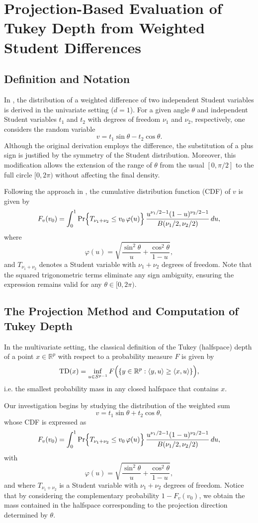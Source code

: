 \chapter{Projection-Based Evaluation of Tukey Depth from Weighted Student Differences}

\section{Definition and Notation}

In \cite{Ruben1960}, the distribution of a weighted difference of two independent Student variables is derived in the univariate setting (\(d=1\)). For a given angle \(\theta\) and independent Student variables \(t_1\) and \(t_2\) with degrees of freedom \(\nu_1\) and \(\nu_2\), respectively, one considers the random variable
\[
v = t_1\sin\theta - t_2\cos\theta.
\]
Although the original derivation employs the difference, the substitution of a plus sign is justified by the symmetry of the Student distribution. Moreover, this modification allows the extension of the range of \(\theta\) from the usual \([0,\pi/2]\) to the full circle \([0,2\pi)\) without affecting the final density.

Following the approach in \cite{Ruben1960}, the cumulative distribution function (CDF) of \(v\) is given by
\[
F_v(v_0)=\int_0^1 \Pr\Bigl\{T_{\nu_1+\nu_2}\le v_0\,\varphi(u)\Bigr\}\,\frac{u^{\nu_1/2-1}(1-u)^{\nu_2/2-1}}{B(\nu_1/2,\nu_2/2)}\,du,
\]
where
\[
\varphi(u)=\sqrt{\frac{\sin^2\theta}{u}+\frac{\cos^2\theta}{1-u}},
\]
and \(T_{\nu_1+\nu_2}\) denotes a Student variable with \(\nu_1+\nu_2\) degrees of freedom. Note that the squared trigonometric terms eliminate any sign ambiguity, ensuring the expression remains valid for any \(\theta\in[0,2\pi)\).

\section{The Projection Method and Computation of Tukey Depth}

In the multivariate setting, the classical definition of the Tukey (halfspace) depth of a point \(x\in\mathbb{R}^p\) with respect to a probability measure \(F\) is given by
\[
\mathrm{TD}(x)=\inf_{u\in S^{p-1}} F\Bigl(\{y\in\mathbb{R}^p:\langle y,u\rangle\ge \langle x,u\rangle\}\Bigr),
\]
i.e. the smallest probability mass in any closed halfspace that contains \(x\).

Our investigation begins by studying the distribution of the weighted sum
\[
v = t_1\sin\theta + t_2\cos\theta,
\]
whose CDF is expressed as
\[
F_v(v_0)=\int_0^1 \Pr\Bigl\{T_{\nu_1+\nu_2}\le v_0\,\varphi(u)\Bigr\}\,\frac{u^{\nu_1/2-1}(1-u)^{\nu_2/2-1}}{B(\nu_1/2,\nu_2/2)}\,du,
\]
with
\[
\varphi(u)=\sqrt{\frac{\sin^2\theta}{u}+\frac{\cos^2\theta}{1-u}},
\]
and where \(T_{\nu_1+\nu_2}\) is a Student variable with \(\nu_1+\nu_2\) degrees of freedom. Notice that by considering the complementary probability \(1-F_v(v_0)\), we obtain the mass contained in the halfspace corresponding to the projection direction determined by \(\theta\).

